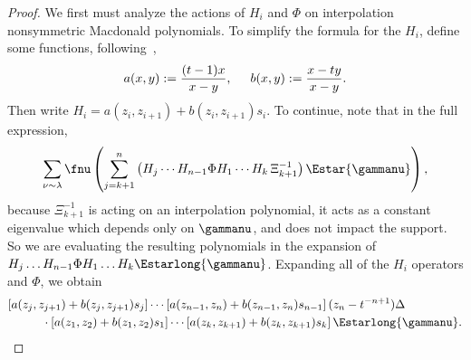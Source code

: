\begin{proof}

We first must analyze the actions of $H_i$ and $\Phi$ on interpolation nonsymmetric Macdonald polynomials. To simplify the formula for the $H_i$, define some functions, following~\cite{MR2525842},
\[ a(x,y) := \frac{(t-1)x}{x-y}, \hspace*{.5cm} b(x,y) := \frac{x-ty}{x-y}.\]
Then write $H_i = a(z_i,z_{i+1}) + b(z_i,z_{i+1}) s_i$. To continue, note that in the full expression,
\begin{equation}\label{rightside}\sum_{\nu \sim \lambda} \fnu\left( \sum_{j=k+1}^n \left( H_j \dotsm H_{n-1} \Phi H_1 \dotsm H_{k} \, \Xi_{k+1}^{-1} \right)  \Estar{\gammanu}\right),\end{equation}
because $\Xi^{-1}_{k+1}$ is acting on an interpolation polynomial, it acts as a constant eigenvalue which depends only on $\gammanu$, and does not impact the support. So we are evaluating the resulting polynomials in the expansion of $H_j \dots H_{n-1} \Phi H_1 \dots H_k \Estarlong{\gammanu}$. 
Expanding all of the $H_i$ operators and $\Phi$, we obtain
\begin{align*} &  [a(z_j,z_{j+1})+b(z_j,z_{j+1}) s_j] \dotsm [a(z_{n-1},z_n)+b(z_{n-1},z_n) s_{n-1}]\,    (z_n-t^{-n+1})\Delta \, \\& \hspace*{1cm} \cdot [a(z_1, z_2)+b(z_1,z_2) s_1] \dotsm [a(z_k,z_{k+1}) + b(z_k,z_{k+1})s_k] \, \Estarlong{\gammanu}.
\end{align*}




\end{proof}

